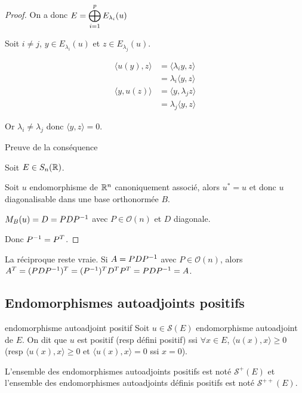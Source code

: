 \begin{proof}
    On a donc $E = \displaystyle \bigoplus_{i = 1}^p E_{\lambda_i}(u)$

    Soit $i \neq j$, $y \in E_{\lambda_i}(u)$ et $z \in E_{\lambda_j}(u)$.

    \begin{align}
        \langle u(y), z \rangle & = \langle \lambda_i y, z \rangle \\
        & = \lambda_i \langle y, z \rangle \\
        \langle y, u(z) \rangle & = \langle y, \lambda_j z \rangle \\
        & = \lambda_j \langle y, z \rangle
    \end{align}

    Or $\lambda_i \neq \lambda_j$ donc $\langle y, z \rangle = 0$. 

    \lvspace Preuve de la conséquence 

    Soit $E \in S_n(\mathbb{R})$. 

    Soit $u$ endomorphisme de $\mathbb{R}^n$ canoniquement associé, alors $u^* = u$ et donc $u$ diagonalisable 
    dans une base orthonormée $B$.

    $M_B(u) = D = PDP^{-1}$ avec $P \in \mathcal O(n)$ et $D$ diagonale.

    Donc $P^{-1} = P^T$. 
\end{proof}

\begin{remarque}
    La réciproque reste vraie. Si $A = PDP^{-1}$ avec $P \in \mathcal O(n)$, alors 
    $A^T = (PDP^{-1})^T = (P^{-1})^T D^T P^T = PDP^{-1} = A$.
\end{remarque}

\subsection{Endomorphismes autoadjoints positifs}

\begin{definition}{endomorphisme autoadjoint positif}{}
    Soit $u \in \mathscr S(E)$ endomorphisme autoadjoint de $E$. On dit que 
    $u$ est positif (resp défini positif) ssi $\forall x \in E$, 
    $\langle u(x), x \rangle \geqslant 0$ (resp $\langle u(x), x \rangle  \geqslant 0$ et 
    $\langle u(x), x \rangle = 0$ ssi $x = 0$).

    L'ensemble des endomorphismes autoadjoints positifs est noté 
    $\mathscr S^+(E)$ et l'ensemble des endomorphismes autoadjoints définis positifs est noté $\mathscr S^{++}(E)$.
\end{definition}

